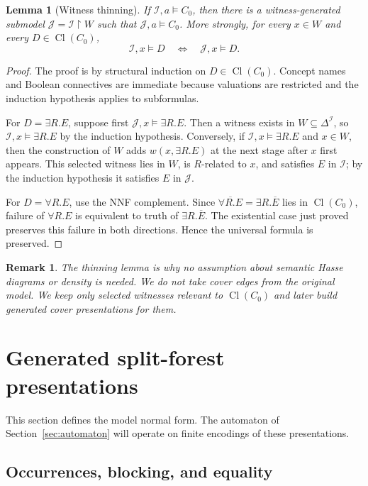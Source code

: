 \documentclass[11pt]{article}
\newtheorem{lemma}[theorem]{Lemma}
\newtheorem{remark}[theorem]{Remark}
\newcommand{\Cl}{\operatorname{Cl}}
\begin{document}
\begin{lemma}[Witness thinning]
If $\mathcal I,a\models C_0$, then there is a witness-generated submodel $\mathcal J=\mathcal I\upharpoonright W$ such that $\mathcal J,a\models C_0$.  More strongly, for every $x\in W$ and every $D\in\Cl(C_0)$,
\[
  \mathcal I,x\models D \quad\Longleftrightarrow\quad \mathcal J,x\models D.
\]
\end{lemma}

\begin{proof}
The proof is by structural induction on $D\in\Cl(C_0)$.  Concept names and Boolean connectives are immediate because valuations are restricted and the induction hypothesis applies to subformulas.

For $D=\exists R.E$, suppose first $\mathcal J,x\models\exists R.E$.  Then a witness exists in $W\subseteq\Delta^{\mathcal I}$, so $\mathcal I,x\models\exists R.E$ by the induction hypothesis.  Conversely, if $\mathcal I,x\models\exists R.E$ and $x\in W$, then the construction of $W$ adds $w(x,\exists R.E)$ at the next stage after $x$ first appears.  This selected witness lies in $W$, is $R$-related to $x$, and satisfies $E$ in $\mathcal I$; by the induction hypothesis it satisfies $E$ in $\mathcal J$.

For $D=\forall R.E$, use the NNF complement.  Since $\overline{\forall R.E}=\exists R.\overline E$ lies in $\Cl(C_0)$, failure of $\forall R.E$ is equivalent to truth of $\exists R.\overline E$.  The existential case just proved preserves this failure in both directions.  Hence the universal formula is preserved.
\end{proof}

\begin{remark}
The thinning lemma is why no assumption about semantic Hasse diagrams or density is needed.  We do not take cover edges from the original model.  We keep only selected witnesses relevant to $\Cl(C_0)$ and later build generated cover presentations for them.
\end{remark}

\section{Generated split-forest presentations}

This section defines the model normal form.  The automaton of Section~\ref{sec:automaton} will operate on finite encodings of these presentations.

\subsection{Occurrences, blocking, and equality}
\end{document}
